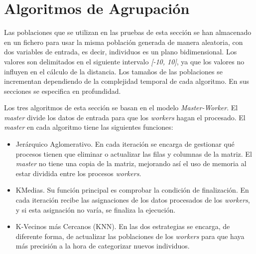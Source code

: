 

\section{Algoritmos de Agrupación}

Las poblaciones que se utilizan en las pruebas de esta sección se han almacenado en un fichero para usar la misma población generada de manera aleatoria, con dos variables de entrada, es decir, individuos es un plano bidimensional. Los valores son delimitados en el siguiente intervalo \textit{[-10, 10]}, ya que los valores no influyen en el cálculo de la distancia. Los tamaños de las poblaciones se incrementan dependiendo de la complejidad temporal de cada algoritmo. En sus secciones se especifica en profundidad.	

Los tres algoritmos de esta sección se basan en el modelo \textit{Master-Worker}. El \textit{master} divide los datos de entrada para que los \textit{workers} hagan el procesado. El \textit{master} en cada algoritmo tiene las siguientes funciones:	

\begin{itemize}
	\item Jerárquico Aglomerativo. En cada iteración se encarga de gestionar qué procesos tienen que eliminar o actualizar las filas y columnas de la matriz. El \textit{master} no tiene una copia de la matriz, mejorando así el uso de memoria al estar dividida entre los procesos \textit{workers}.
	\item KMedias. Su función principal es comprobar la condición de finalización. En cada iteración recibe las asignaciones de los datos procesados de los \textit{workers}, y si esta asignación no varía, se finaliza la ejecución.
	\item K-Vecinos más Cercanos (KNN). En las dos estrategias se encarga, de diferente forma, de actualizar las poblaciones de los \textit{workers} para que haya más precisión a la hora de categorizar nuevos individuos.
\end{itemize} 


